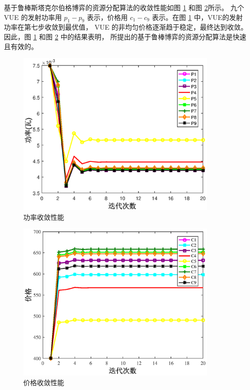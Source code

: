 基于鲁棒斯塔克尔伯格博弈的资源分配算法的收敛性能如图 \ref{功率收敛性能} 和图 \ref{价格收敛性能}所示。
九个 VUE 的发射功率用 $p_{1}-p_{9}$ 表示，价格用 $c_{1}-c_{9}$ 表示。在图 \ref{功率收敛性能} 中，VUE的发射功率在第七步收敛到最优值，
VUE 的非均匀价格逐渐趋于稳定，最终达到收敛。因此，图 \ref{功率收敛性能} 和图 \ref{价格收敛性能} 中的结果表明，
所提出的基于鲁棒博弈的资源分配算法是快速且有效的。
\begin{figure}[H]
\centering
\includegraphics[width=10cm]{figures//chap2//功率.eps}
\caption{功率收敛性能}
\label{功率收敛性能}
\end{figure}
\begin{figure}[H]
\centering
\includegraphics[width=10cm]{figures//chap2//价格.eps}
\caption{价格收敛性能}
\label{价格收敛性能}
\end{figure}

